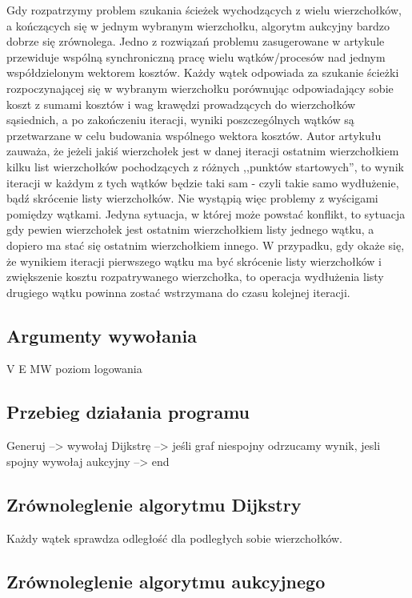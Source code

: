 \documentclass {article}
\begin{document}
Gdy rozpatrzymy problem szukania ścieżek wychodzących z wielu wierzchołków, a kończących się w jednym wybranym wierzchołku, algorytm aukcyjny bardzo dobrze się zrównolega. Jedno z rozwiązań problemu zasugerowane w artykule \cite{TODO} przewiduje wspólną synchroniczną pracę wielu wątków/procesów nad jednym współdzielonym wektorem kosztów. Każdy wątek odpowiada za szukanie ścieżki rozpoczynającej się w wybranym wierzchołku porównując odpowiadający sobie koszt z sumami kosztów i wag krawędzi prowadzących do wierzchołków sąsiednich, a po zakończeniu iteracji, wyniki poszczególnych wątków są przetwarzane w celu budowania wspólnego wektora kosztów. Autor artykułu zauważa, że jeżeli jakiś wierzchołek jest w danej iteracji ostatnim wierzchołkiem kilku list wierzchołków pochodzących z różnych ,,punktów startowych'', to wynik iteracji w każdym z tych wątków będzie taki sam - czyli takie samo wydłużenie, bądź skrócenie listy wierzchołków. Nie wystąpią więc problemy z wyścigami pomiędzy wątkami. Jedyna sytuacja, w której może powstać konflikt, to sytuacja gdy pewien wierzchołek jest ostatnim wierzchołkiem listy jednego wątku, a dopiero ma stać się ostatnim wierzchołkiem innego. W przypadku, gdy okaże się, że wynikiem iteracji pierwszego wątku ma być skrócenie listy wierzchołków i zwiększenie kosztu rozpatrywanego wierzchołka, to operacja wydłużenia listy drugiego wątku powinna zostać wstrzymana do czasu kolejnej iteracji.

\subsection{Argumenty wywołania}

V E MW poziom logowania

\subsection{Przebieg działania programu}

Generuj --> wywołaj Dijkstrę --> jeśli graf niespojny odrzucamy wynik, jesli spojny wywołaj aukcyjny --> end

\subsection{Zrównoleglenie algorytmu Dijkstry}

Każdy wątek sprawdza odległość dla podległych sobie wierzchołków.

\subsection{Zrównoleglenie algorytmu aukcyjnego}
\end{document}
